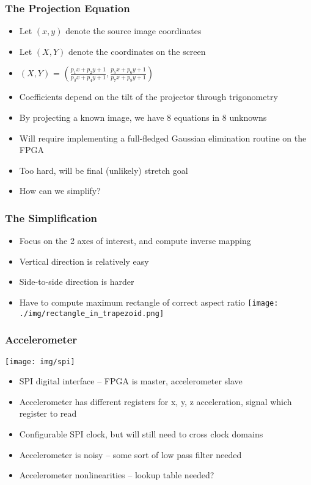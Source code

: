 \documentclass{beamer}
\begin{document}
\begin{frame}
\frametitle{The Projection Equation}
\begin{itemize}
\item Let $(x, y)$ denote the source image coordinates
\item Let $(X, Y)$ denote the coordinates on the screen
\item $(X, Y)$ = $\left( \frac{p_1x + p_2y + 1}{p_3x + p_4y + 1}, \frac{p_5x + p_6y + 1}{p_7x + p_8y + 1} \right)$
\item Coefficients depend on the tilt of the projector through trigonometry
\pause
\item By projecting a known image, we have 8 equations in 8 unknowns
\item Will require implementing a full-fledged Gaussian elimination routine on the FPGA
\item Too hard, will be final (unlikely) stretch goal
\item How can we simplify?
\end{itemize}
\end{frame}

\begin{frame}
\frametitle{The Simplification}
\begin{itemize}
\item Focus on the 2 axes of interest, and compute inverse mapping
\item Vertical direction is relatively easy
\item Side-to-side direction is harder
\pause
\item Have to compute maximum rectangle of correct aspect ratio
\texttt{[image: ./img/rectangle\_in\_trapezoid.png]}
\end{itemize}
\end{frame}

\begin{frame}
\frametitle{Accelerometer}
\texttt{[image: img/spi]}
\begin{itemize}
\item SPI digital interface -- FPGA is master, accelerometer slave
\item Accelerometer has different registers for x, y, z acceleration, signal which register to read
\item Configurable SPI clock, but will still need to cross clock domains
\item Accelerometer is noisy -- some sort of low pass filter needed
\item Accelerometer nonlinearities -- lookup table needed?
\end{itemize}
\end{frame}
\end{document}
